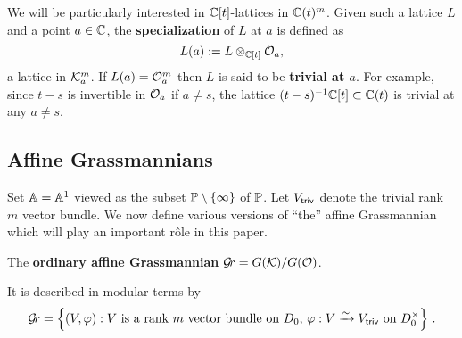 \documentclass[draft]{article}
\begin{document}
We will be particularly interested in $\CC[t]$-lattices in $ \CC(t)^m$. 
Given such a lattice $ L $ and a point $ a \in \CC$, the \textbf{specialization} of $ L $ at $ a $ is defined as
$$
L(a) := L \otimes_{\CC[t]} \cO_a, 
$$
a lattice in $\cK_a^m$. 
If 
$L(a) = \cO_a^m$ then $L$ is said to be \textbf{trivial at $a$}. 
For example, since $t-s $ is invertible in $ \cO_a $ if $ a \ne s $, the lattice $(t-s)^{-1}\CC[t] \subset \CC(t)$ is trivial at any $a\ne s$. 






\subsection{Affine Grassmannians} %
Set $\AA = \AA^1$ viewed as the subset $\PP\setminus \{\infty\}$ of $\PP$. Let $\Vtriv$ denote the trivial rank $ m $ vector bundle. 
% 
We now define various versions of ``the'' affine Grassmannian which will play an important r\^ole in this paper.

\begin{definition}
     The \textbf{ordinary affine Grassmannian} $\Gr = G(\cK)/G(\cO)$.
\end{definition}    
    It is described in modular terms by 
    $$
     \Gr = 
    \left\{ (V, \varphi) : \text{$V$ is a rank $m$ vector bundle on $ D_0 $, $\varphi : V \xrightarrow{\sim} \Vtriv $ on $ D_0^\times $} \right\} \,. 
    $$
\end{document}
